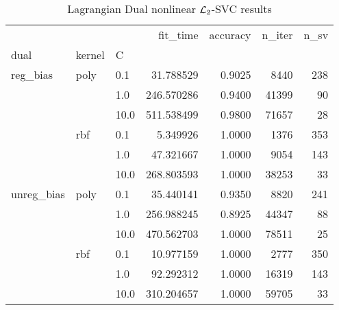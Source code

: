 \begin{table}[H]
\centering
\caption{Lagrangian Dual nonlinear $\protect \mathcal{L}_2$-SVC results}
\label{nonlinear_lagrangian_dual_l2_svc_cv_results}
\begin{tabular}{lllrrrr}
\toprule
           &     &      &    fit\_time &  accuracy &  n\_iter &  n\_sv \\
dual & kernel & C &             &           &         &       \\
\midrule
reg\_bias & poly & 0.1  &   31.788529 &    0.9025 &    8440 &   238 \\
           &     & 1.0  &  246.570286 &    0.9400 &   41399 &    90 \\
           &     & 10.0 &  511.538499 &    0.9800 &   71657 &    28 \\
           & rbf & 0.1  &    5.349926 &    1.0000 &    1376 &   353 \\
           &     & 1.0  &   47.321667 &    1.0000 &    9054 &   143 \\
           &     & 10.0 &  268.803593 &    1.0000 &   38253 &    33 \\
unreg\_bias & poly & 0.1  &   35.440141 &    0.9350 &    8820 &   241 \\
           &     & 1.0  &  256.988245 &    0.8925 &   44347 &    88 \\
           &     & 10.0 &  470.562703 &    1.0000 &   78511 &    25 \\
           & rbf & 0.1  &   10.977159 &    1.0000 &    2777 &   350 \\
           &     & 1.0  &   92.292312 &    1.0000 &   16319 &   143 \\
           &     & 10.0 &  310.204657 &    1.0000 &   59705 &    33 \\
\bottomrule
\end{tabular}
\end{table}
